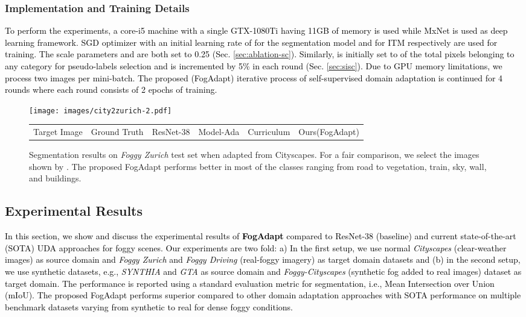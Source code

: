 \documentclass[final,5p,times,twocolumn]{elsarticle}
\begin{document}
\subsubsection{Implementation and Training Details}
\textcolor{black}{
To perform the experiments, a core-i5 machine with a single GTX-1080Ti having 11GB of memory is used while MxNet \cite{mxnet15} is used as deep learning framework. 
SGD optimizer with an initial learning rate of  for the segmentation model and  for ITM respectively are used for training. 
\textcolor{black}{The scale parameters  and  are both set to 0.25 (Sec. \ref{sec:ablation-sc}). }
Similarly,  is initially set to  of the total pixels belonging to any category for pseudo-labels selection and is incremented by 5\% in each round (Sec. \ref{sec:sisc}).
Due to GPU memory limitations, we process two images per mini-batch.
The proposed (FogAdapt) iterative process of self-supervised domain adaptation is continued for 4 rounds where each round consists of 2 epochs of training.}

\begin{figure*}[t]
	\centering
	\texttt{[image: images/city2zurich-2.pdf]}\\
	\footnotesize
	\begin{tabular}{P{1.5cm}P{1.55cm}P{1.7cm}P{1.8cm}P{1.5cm}P{1.5cm}}
    Target Image & Ground Truth & ResNet-38\cite{wu2019Resnet38} &Model-Ada\cite{sakaridis2018model} &Curriculum\cite{dai2019curriculum} & Ours(FogAdapt)
    \end{tabular}
	\caption{Segmentation results on \textit{Foggy Zurich} test set when adapted from Cityscapes. For a fair comparison, we select the images shown by \cite{dai2019curriculum}. The proposed FogAdapt performs better in most of the classes ranging from road to vegetation, train, sky, wall, and buildings.}
	\label{img:city2zurich}
\end{figure*}
\subsection{Experimental Results}
\sloppy
\textcolor{black}{
In this section, we show and discuss the experimental results of \textbf{FogAdapt} compared to ResNet-38 (baseline) and current state-of-the-art (SOTA) UDA approaches for foggy scenes.
Our experiments are two fold: a) In the first setup, we use normal \textit{Cityscapes} (clear-weather images) as source domain and \textit{Foggy Zurich} and \textit{Foggy Driving} (real-foggy imagery) as target domain datasets and (b) in the second setup, we use synthetic datasets, e.g., \textit{SYNTHIA} and \textit{GTA} as source domain and \textit{Foggy-Cityscapes} (synthetic fog added to real images) dataset as target domain.
The performance is reported using a standard evaluation metric for segmentation, i.e.,  Mean Intersection over Union (mIoU). 
The proposed FogAdapt performs superior compared to other domain adaptation approaches with SOTA performance on multiple benchmark datasets varying from synthetic to real for dense foggy conditions.}
\end{document}
